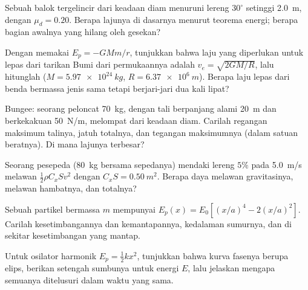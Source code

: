 \begin{exercise}[$\star\star$]\label{exo:b1:work-and-energy:5}
Sebuah balok tergelincir dari keadaan diam menuruni lereng $30^\circ$
setinggi \qty{2.0}{m}, dengan $\mu_d = 0.20$. Berapa lajunya di dasarnya
menurut teorema energi; berapa bagian  awalnya yang
hilang oleh gesekan?
\end{exercise}

\begin{exercise}[$\star\star$]\label{exo:b1:work-and-energy:6}
Dengan memakai $E_p = -GMm/r$, tunjukkan bahwa laju yang diperlukan
untuk lepas dari tarikan Bumi dari permukaannya adalah
$v_e = \sqrt{2GM/R}$, lalu hitunglah
($M = \qty{5.97e24}{kg}$, $R = \qty{6.37e6}{m}$). Berapa laju lepas dari
benda bermassa jenis sama tetapi berjari-jari dua kali lipat?
\end{exercise}

\begin{exercise}[$\star\star$]\label{exo:b1:work-and-energy:7}
Bungee: seorang peloncat \qty{70}{kg}, dengan tali berpanjang alami
\qty{20}{m} dan berkekakuan \qty{50}{N/m}, melompat dari keadaan diam.
Carilah regangan maksimum talinya, jatuh totalnya, dan tegangan
maksimumnya (dalam satuan beratnya). Di mana lajunya terbesar?
\end{exercise}

\begin{exercise}[$\star\star$]\label{exo:b1:work-and-energy:8}
Seorang pesepeda (\qty{80}{kg} bersama sepedanya) mendaki lereng $5\%$
pada \qty{5.0}{m/s} melawan  $\tfrac12\rho C_xSv^2$ dengan
$C_xS = \qty{0.50}{m^2}$. Berapa daya melawan gravitasinya, melawan
hambatnya, dan totalnya?
\end{exercise}

\begin{exercise}[$\star\star$]\label{exo:b1:work-and-energy:9}
Sebuah partikel bermassa $m$ mempunyai $E_p(x) = E_0[(x/a)^4 - 2(x/a)^2]$.
Carilah kesetimbangannya dan kemantapannya, kedalaman sumurnya, dan
  di sekitar kesetimbangan yang mantap.
\end{exercise}

\begin{exercise}[$\star\star\star$]\label{exo:b1:work-and-energy:10}
Untuk osilator harmonik $E_p = \tfrac12 kx^2$, tunjukkan bahwa kurva
fasenya berupa elips, berikan setengah sumbunya untuk energi $E$, lalu
jelaskan mengapa semuanya ditelusuri dalam waktu yang sama.
\end{exercise}

